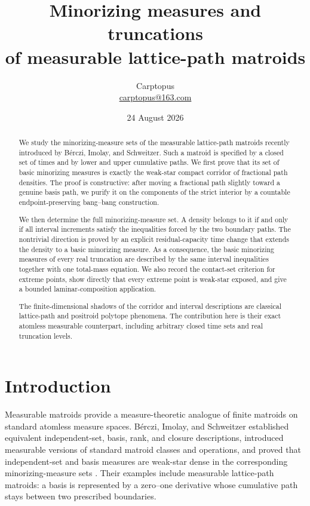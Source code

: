 \documentclass[11pt]{article}
\title{Minorizing measures and truncations\\
of measurable lattice-path matroids}
\author{Carptopus\\\href{mailto:carptopus@163.com}{carptopus@163.com}}
\date{24 August 2026}
\numberwithin{equation}{section}
\begin{document}
\maketitle

\begin{center}
\end{center}

\begin{abstract}


We study the minorizing-measure sets of the measurable lattice-path matroids recently
introduced by Bérczi, Imolay, and Schweitzer. Such a matroid is specified by a closed
set of times and by lower and upper cumulative paths. We first prove that its set of
basic minorizing measures is exactly the weak-star compact corridor of fractional path
densities. The proof is constructive: after moving a fractional path slightly toward
a genuine basis path, we purify it on the components of the strict interior by a
countable endpoint-preserving bang--bang construction.

We then determine the full minorizing-measure set. A density belongs to it if and only
if all interval increments satisfy the inequalities forced by the two boundary paths.
The nontrivial direction is proved by an explicit residual-capacity time change that
extends the density to a basic minorizing measure. As a consequence, the basic
minorizing measures of every real truncation are described by the same interval
inequalities together with one total-mass equation. We also record the contact-set
criterion for extreme points, show directly that every extreme point is weak-star
exposed, and give a bounded laminar-composition application.

The finite-dimensional shadows of the corridor and interval descriptions are classical
lattice-path and positroid polytope phenomena. The contribution here is their exact
atomless measurable counterpart, including arbitrary closed time sets and real
truncation levels.

\end{abstract}

\section{Introduction}


Measurable matroids provide a measure-theoretic analogue of finite matroids on standard
atomless measure spaces. Bérczi, Imolay, and Schweitzer established equivalent
independent-set, basis, rank, and closure descriptions, introduced measurable versions
of standard matroid classes and operations, and proved that independent-set and basis
measures are weak-star dense in the corresponding minorizing-measure sets \cite{berczi2026}. Their
examples include measurable lattice-path matroids: a basis is represented by a
zero--one derivative whose cumulative path stays between two prescribed boundaries.
\end{document}
